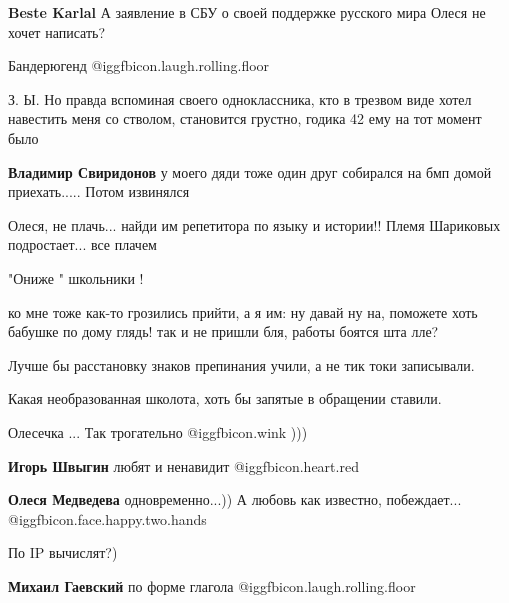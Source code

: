 \begin{itemize}
\begin{itemize}
\textbf{Beste Karlal} А заявление в СБУ о своей поддержке русского мира Олеся не хочет написать?
\end{itemize} %


Бандерюгенд @igg{fbicon.laugh.rolling.floor} 

З. Ы. Но правда вспоминая своего одноклассника, кто в трезвом виде хотел
навестить меня со стволом, становится грустно, годика 42 ему на тот момент было

\begin{itemize} %
\textbf{Владимир Свиридонов} у моего дяди тоже один друг собирался на бмп домой приехать..... Потом извинялся
\end{itemize} %

Олеся, не плачь... найди им репетитора по языку и истории!! Племя Шариковых подростает... все плачем

"Ониже " школьники !


ко мне тоже как-то грозились прийти, а я им: ну давай ну на, поможете хоть
бабушке по дому глядь! так и не пришли бля, работы боятся шта лле?


Лучше бы расстановку знаков препинания учили, а не тик токи записывали.

Какая необразованная школота, хоть бы запятые в обращении ставили.

Олесечка ... Так трогательно  @igg{fbicon.wink}  )))

\begin{itemize} %
\textbf{Игорь Швыгин} любят и ненавидит @igg{fbicon.heart.red}

\textbf{Олеся Медведева} одновременно...)) А любовь как известно, побеждает... @igg{fbicon.face.happy.two.hands} 
\end{itemize} %


По IP вычислят?)

\begin{itemize} %
\textbf{Михаил Гаевский} по форме глагола  @igg{fbicon.laugh.rolling.floor} 


\end{itemize}
\end{itemize}
